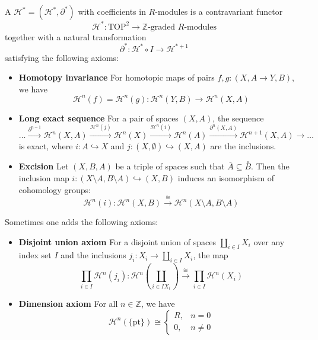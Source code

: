 \documentclass[a4paper,11pt]{article}
\begin{document}
\begin{definition}
    A  \(\mathcal{H}^\ast=(\mathcal{H}^\ast,\partial^\ast)\) with coefficients in \(R\)-modules is a contravariant functor \[\mathcal{H}^\ast:\mathrm{TOP}^2\to\mathbb{Z}\text{-graded }R\text{-modules}\] together with a natural transformation \[\partial^\ast:\mathcal{H}^\ast\circ I\to\mathcal{H}^{\ast+1}\] satisfying the following axioms:
    \begin{itemize}
        \item \textbf{Homotopy invariance} For homotopic maps of pairs \(f,g:(X,A\to Y,B)\), we have \[\mathcal{H}^n(f)=\mathcal{H}^n(g):\mathcal{H}^n(Y,B)\to\mathcal{H}^n(X,A)\]
        \item \textbf{Long exact sequence} For a pair of spaces \((X,A)\), the sequence \[\dots\xrightarrow{\partial^{n-1}}\mathcal{H}^n(X,A)\xrightarrow{\mathcal{H}^n(j)}\mathcal{H}^n(X)\xrightarrow{\mathcal{H}^n(i)}\mathcal{H}^n(A)\xrightarrow{\partial^n(X,A)}\mathcal{H}^{n+1}(X,A)\rightarrow\dots\] is exact, where \(i:A\hookrightarrow X\) and \(j:(X,\emptyset)\hookrightarrow (X,A)\) are the inclusions.
        \item \textbf{Excision} Let \((X,B,A)\) be a triple of spaces such that \(\overline{A}\subseteq\overset{\circ}{B}\). Then the inclusion map \(i:(X\setminus A,B\setminus A)\hookrightarrow(X,B)\) induces an isomorphism of cohomology groups: \[\mathcal{H}^n(i):\mathcal{H}^n(X,B)\xrightarrow{\cong}\mathcal{H}^n(X\setminus A, B\setminus A)\]
    \end{itemize}
    Sometimes one adds the following axioms:
    \begin{itemize}
        \item \textbf{Disjoint union axiom}
        For a disjoint union of spaces \(\coprod_{i\in I}X_i\) over any index set \(I\) and the inclusions \(j_i:X_i\to\coprod_{i\in I}X_i\), the map
        \[\prod_{i\in I}\mathcal{H}^n(j_i):\mathcal{H}^n\left(\coprod_{i\in I X_i}\right)\xrightarrow{\cong}\prod_{i\in I}\mathcal{H}^n(X_i)\]
        \item \textbf{Dimension axiom}
        For all \(n\in\mathbb{Z}\), we have \[\mathcal{H}^n(\{\mathrm{pt}\})\cong\begin{cases} R, & n=0\\ 0, & n\neq0\end{cases}\]
    \end{itemize}
\end{definition}
\end{document}
